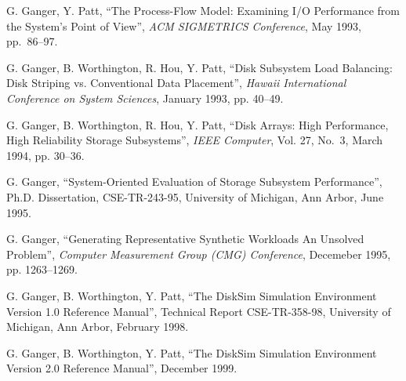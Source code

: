 \begin{thebibliography}{99}

G. Ganger, Y. Patt,
``The Process-Flow Model: Examining I/O Performance from the System's Point of View'',
{\it ACM SIGMETRICS Conference},
May 1993, \mbox{pp. 86--97}.

G. Ganger, B. Worthington, R. Hou, Y. Patt,
``Disk Subsystem Load Balancing: Disk Striping vs. Conventional Data Placement'',
{\it Hawaii International Conference on System Sciences},
January 1993, pp. 40--49.


G. Ganger, B. Worthington, R. Hou, Y. Patt,
``Disk Arrays: High Performance, High Reliability Storage Subsystems'',
{\it IEEE Computer},
Vol. 27, \mbox{No. 3}, March 1994, pp. 30--36.


G. Ganger,
``System-Oriented Evaluation of Storage Subsystem Performance'',
Ph.D. Dissertation, CSE-TR-243-95, University of Michigan, Ann Arbor,
June 1995.

G. Ganger,
``Generating Representative Synthetic Workloads An Unsolved Problem'',
{\it Computer Measurement Group (CMG) Conference},
Decemeber 1995, pp. 1263--1269.

G. Ganger, B. Worthington, Y. Patt,
``The DiskSim Simulation Environment Version 1.0 Reference Manual'',
Technical Report CSE-TR-358-98, University of Michigan, Ann Arbor,
February 1998.

G. Ganger, B. Worthington, Y. Patt,
``The DiskSim Simulation Environment Version 2.0 Reference Manual'',
December 1999.



\end{thebibliography}
